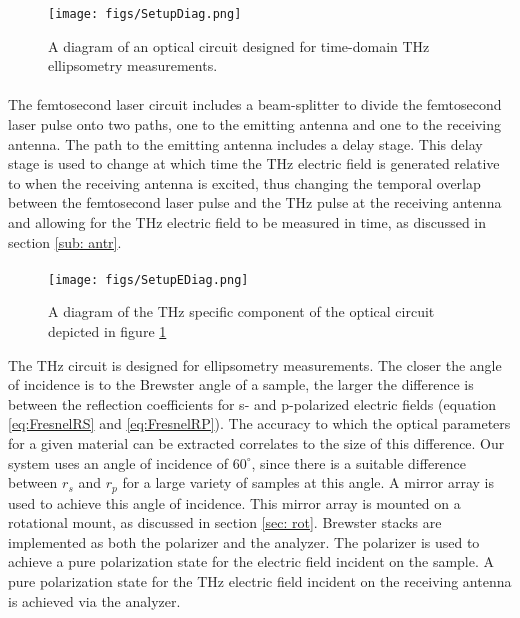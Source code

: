 \begin{figure}[H]
\begin{center}
	 \texttt{[image: figs/SetupDiag.png]}
	 \caption{A diagram of an optical circuit designed for time-domain THz ellipsometry measurements.}
   \label{fig:SetDiag}
\end{center}
\end{figure}

\paragraph{}
The femtosecond laser circuit includes a beam-splitter to divide the femtosecond laser pulse onto two paths, one to the emitting antenna and one to the receiving antenna. The path to the emitting antenna includes a delay stage. This delay stage is used to change at which time the THz electric field is generated  relative to when the receiving antenna is excited, thus changing the temporal overlap between the femtosecond laser pulse and the THz pulse at the receiving antenna and allowing for the THz electric field to be measured in time, as discussed in section \ref{sub: antr}.
\paragraph{}
\begin{figure}[H]
\begin{center}
	 \texttt{[image: figs/SetupEDiag.png]}
	 \caption{A diagram of the THz specific component of the optical circuit depicted in figure \ref{fig:SetDiag}}
   \label{fig:SetEDiag}
\end{center}
\end{figure}
The THz circuit is designed for ellipsometry measurements. The closer the angle of incidence is to the Brewster angle of a sample, the larger the difference is between the reflection coefficients for s- and p-polarized electric fields (equation \ref{eq:FresnelRS} and \ref{eq:FresnelRP}). The accuracy to which the optical parameters for a given material can be extracted correlates to the size of this difference. Our system uses an angle of incidence of $60^{\circ}$, since there is a suitable difference between $r_{s}$ and $r_{p}$ for a large variety of samples at this angle. A mirror array is used to achieve this angle of incidence. This mirror array is mounted on a rotational mount, as discussed in section \ref{sec: rot}. Brewster stacks are implemented as both the polarizer and the analyzer. The polarizer is used to achieve a pure polarization state for the electric field incident on the sample. A pure polarization state for the THz electric field incident on the receiving antenna is achieved via the analyzer.
\endinput